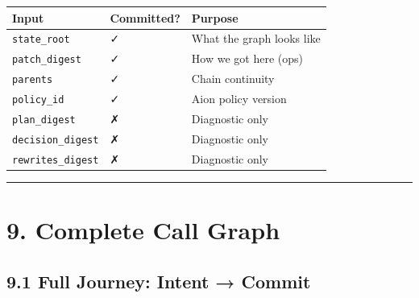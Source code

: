 \documentclass[
]{book}
\newcounter{none} %
\begin{document}
{\def\LTcaptype{none} %
\begin{longtable}[]{@{}lll@{}}
\toprule\noalign{}
Input & Committed? & Purpose \\
\midrule\noalign{}
\endhead
\bottomrule\noalign{}
\endlastfoot
\texttt{state\_root} & ✓ & What the graph looks like \\
\texttt{patch\_digest} & ✓ & How we got here (ops) \\
\texttt{parents} & ✓ & Chain continuity \\
\texttt{policy\_id} & ✓ & Aion policy version \\
\texttt{plan\_digest} & ✗ & Diagnostic only \\
\texttt{decision\_digest} & ✗ & Diagnostic only \\
\texttt{rewrites\_digest} & ✗ & Diagnostic only \\
\end{longtable}
}

\begin{center}\rule{0.5\linewidth}{0.5pt}\end{center}

\section{9. Complete Call Graph}\label{complete-call-graph}

\subsection{9.1 Full Journey: Intent →
Commit}\label{full-journey-intent-commit}
\end{document}

